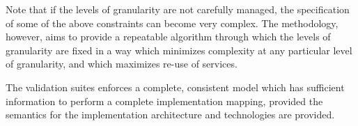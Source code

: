 Note that if the levels of granularity are not carefully managed,
the specification of some of the above constraints can become very complex. The
methodology, however, aims to provide a repeatable algorithm through which the levels
of granularity are fixed in a way which minimizes complexity at any particular level
of granularity, and which maximizes re-use of services.

The validation suites enforces a complete, consistent model which has sufficient
information to perform a complete implementation mapping, provided the semantics
for the implementation architecture and technologies are provided.
